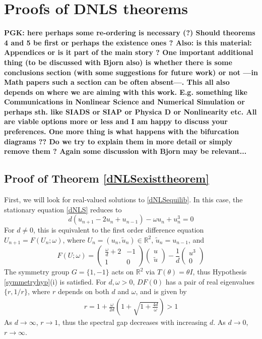 \documentclass[12pt]{article}
\def\R{{\mathbb R}}
\begin{document}
\section{Proofs of DNLS theorems}

{\bf PGK: here perhaps some re-ordering is necessary (?)
Should theorems 4 and 5 be first or perhaps the existence
ones ? Also: is this material: Appendices or is it 
part of the main story ? One important additional thing
(to be discussed with Bjorn also) is whether there is
some conclusions section (with some suggestions for
future work) or not ---in Math papers such a
section can be
often absent---. This all also depends on where we
are aiming with this work. E.g. something like
Communications in Nonlinear Science and Numerical
Simulation or perhaps sth. like SIADS or SIAP or Physica
D or Nonlinearity etc. All are viable options more or 
less and I am happy to discuss your preferences.
One more thing is what happens with the bifurcation
diagrams ?? Do we try to explain them in more
detail or simply remove them ? Again some discussion
with Bjorn may be relevant...}

\subsection{Proof of Theorem \ref{dNLSexisttheorem}}

First, we will look for real-valued solutions to \eqref{dNLSequilib}. In this case, the stationary equation \eqref{dNLS} reduces to
\begin{equation*}
d(u_{n+1} - 2 u_n + u_{n-1}) - \omega u_n + u_n^3 = 0
\end{equation*}
For $d \neq 0$, this is equivalent to the first order difference equation $U_{n+1} = F(U_n; \omega)$, where $U_n = (u_n, \tilde{u}_n) \in \R^2$, $\tilde{u}_n = u_{n-1}$, and 
\begin{equation}\label{dnlsdiffR2}
F(U; \omega) = 
\begin{pmatrix}
\frac{\omega}{d} + 2 & -1 \\
1 & 0
\end{pmatrix}
\begin{pmatrix}
u \\ \tilde{u}
\end{pmatrix}
- \frac{1}{d} 
\begin{pmatrix}
u^3 \\ 0
\end{pmatrix}
\end{equation}
The symmetry group $G = \{ 1, -1\}$ acts on $\R^2$ via $T(\theta) = \theta I$, thus Hypothesis \ref{symmetryhyp}(i) is satisfied. For $d, \omega > 0$, $DF(0)$ has a pair of real eigenvalues $\{r, 1/r \}$, where $r$ depends on both $d$ and $\omega$, and is given by
\begin{align}\label{defr}
r = 1 + \frac{\omega}{2 d} \left( 1 + \sqrt{1 + \frac{4 d}{\omega}} \right) > 1
\end{align}
As $d \rightarrow \infty$, $r \rightarrow 1$, thus the spectral gap decreases with increasing $d$. As $d \rightarrow 0$, $r \rightarrow \infty$.
\end{document}
